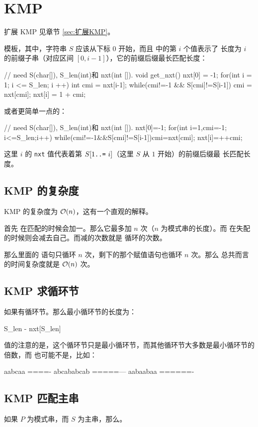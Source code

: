 \section{KMP} \label{sec:KMP}
扩展 KMP 见章节 \ref{sec:扩展KMP}。

模板，其中，字符串 $S$ 应该从下标 $0$ 开始，而且  中的第 $i$ 个值表示了
长度为 $i$ 的前缀子串（对应区间 $[0, i-1]$），它的前缀后缀最长匹配长度：
\begin{Cpp}
// need S(char[]), S_len(int)和 nxt(int []).
void get_nxt() {
  nxt[0] = -1;
  for(int i = 1; i <= S_len; i ++) {
    int cmi = nxt[i-1];
    while(cmi!=-1 && S[cmi]!=S[i-1]) {
      cmi = nxt[cmi];
    }
    nxt[i] = 1 + cmi;
  }
}
\end{Cpp}

或者更简单一点的：
\begin{Cpp}
// need S(char[]), S_len(int)和 nxt(int []).
{
  nxt[0]=-1; for(int i=1,cmi=-1; i<=S_len;i++){
    while(cmi!=-1&&S[cmi]!=S[i-1])cmi=nxt[cmi];
    nxt[i]=++cmi;
  }
}
\end{Cpp}

这里 $i$ 的 \verb|nxt| 值代表着第 $S[1\text{\texttt{..=} }i]$（这里 $S$ 从 $1$ 开始）的前缀后缀最
长匹配长度。

\subsection{KMP 的复杂度}
KMP 的复杂度为 $\mathcal{O}(n)$，这有一个直观的解释。

首先  在匹配的时候会加一。那么它最多加 $n$ 次（$n$ 为模式串的长度）。而
在失配的时候则会减去自己。而减的次数就是  循环的次数。

那么里面的  语句只循环 $n$ 次，剩下的那个赋值语句也循环 $n$ 次。那么
总共而言的时间复杂度就是 $\mathcal{O}(n)$ 次。

\subsection{KMP 求循环节}
如果有循环节。那么最小循环节的长度为：
\begin{Cpp}
S_len - nxt[S_len]
\end{Cpp}

值的注意的是，这个循环节只是最小循环节，而其他循环节大多数是最小循环节的倍数，而
也可能不是，比如：
\begin{Cpp}
aabcaa
====-
abcababcab
=====---
aabaabaa
======-
\end{Cpp}

\subsection{KMP 匹配主串}
如果 $P$ 为模式串，而 $S$ 为主串，那么。

